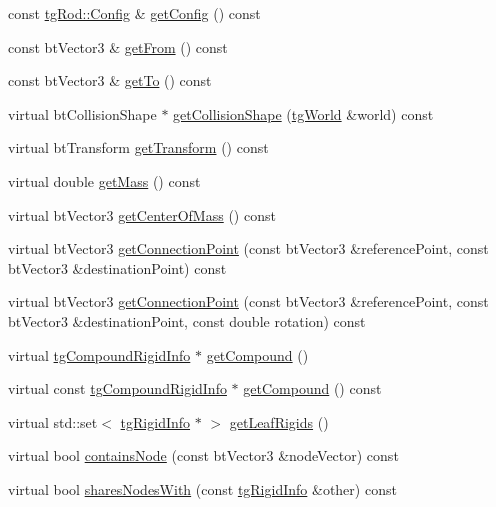 \begin{DoxyCompactItemize}
\item 
const \hyperlink{structtg_rod_1_1_config}{tg\-Rod\-::\-Config} \& \hyperlink{classtg_rod_info_a2cf0a72df3b387b63cd8764c2433e60a}{get\-Config} () const 
\item 
const bt\-Vector3 \& \hyperlink{classtg_rod_info_ae01749001df67fbff4d7ce040888b599}{get\-From} () const 
\item 
const bt\-Vector3 \& \hyperlink{classtg_rod_info_a0c07df4b53bd91888d0180d6b5d6d804}{get\-To} () const 
\item 
virtual bt\-Collision\-Shape $\ast$ \hyperlink{classtg_rod_info_a96e1c559014d7ec068265b49582484a9}{get\-Collision\-Shape} (\hyperlink{classtg_world}{tg\-World} \&world) const 
\item 
virtual bt\-Transform \hyperlink{classtg_rod_info_a24abe5478302164d03c2bcbd524db85d}{get\-Transform} () const 
\item 
virtual double \hyperlink{classtg_rod_info_a6483466479b4d6a54634103e7d555884}{get\-Mass} () const 
\item 
virtual bt\-Vector3 \hyperlink{classtg_rod_info_a5857eea8b1f79344b82860f7b693c27a}{get\-Center\-Of\-Mass} () const 
\item 
virtual bt\-Vector3 \hyperlink{classtg_rod_info_aca23f26087d16107f258c24317b505df}{get\-Connection\-Point} (const bt\-Vector3 \&reference\-Point, const bt\-Vector3 \&destination\-Point) const 
\item 
virtual bt\-Vector3 \hyperlink{classtg_rod_info_a89e3ba148877bec946dec12a85c24eec}{get\-Connection\-Point} (const bt\-Vector3 \&reference\-Point, const bt\-Vector3 \&destination\-Point, const double rotation) const 
\item 
virtual \hyperlink{classtg_compound_rigid_info}{tg\-Compound\-Rigid\-Info} $\ast$ \hyperlink{classtg_rod_info_aafb7e1f895fcbb0ccda9c372d6e0e36b}{get\-Compound} ()
\item 
virtual const \hyperlink{classtg_compound_rigid_info}{tg\-Compound\-Rigid\-Info} $\ast$ \hyperlink{classtg_rod_info_af30ba2b40867f337110976354fa795fd}{get\-Compound} () const 
\item 
virtual std\-::set$<$ \hyperlink{classtg_rigid_info}{tg\-Rigid\-Info} $\ast$ $>$ \hyperlink{classtg_rod_info_ad35a38bd39a06c1c1e592451a7178885}{get\-Leaf\-Rigids} ()
\item 
virtual bool \hyperlink{classtg_rod_info_abcd658cb529d023d27f5a1943a69fd0e}{contains\-Node} (const bt\-Vector3 \&node\-Vector) const 
\item 
virtual bool \hyperlink{classtg_rod_info_aaeb0b149e81d3ff85f191b913889e54f}{shares\-Nodes\-With} (const \hyperlink{classtg_rigid_info}{tg\-Rigid\-Info} \&other) const 

\end{DoxyCompactItemize}
